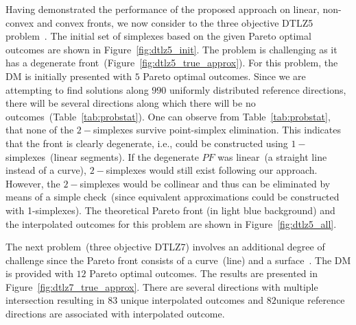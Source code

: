 Having demonstrated the performance of the proposed approach on linear, non-convex and convex fronts, we now consider to the three objective DTLZ5 problem~\cite{deb2002scalable}.  The initial set of {\color{blue}simplexes} based on the given Pareto optimal outcomes are shown in Figure~\ref{fig:dtlz5_init}. The problem is challenging as it has a degenerate front~(Figure~\ref{fig:dtlz5_true_approx}). For this problem, the DM is initially presented with $5$ Pareto optimal outcomes. Since we are attempting to find solutions along $990$ uniformly distributed reference directions, there will be several directions along which there will be no outcomes~(Table~\ref{tab:probstat}). One can observe from Table~\ref{tab:probstat}, that none of the $2-${\color{blue}simplexes} survive point-{\color{blue}simplex} elimination. This indicates that the front is clearly degenerate, i.e., could be constructed using $1-${\color{blue}simplexes}~(linear segments). If the degenerate $PF$ was linear~(a straight line instead of a curve), $2-${\color{blue}simplexes} would still exist following our approach. However, the $2-${\color{blue}simplexes} would be collinear and thus can be eliminated {\color{blue}by means of a simple check}~(since equivalent approximations could be constructed with 1-{\color{blue}simplexes}). The theoretical Pareto front (in light blue background) and the interpolated outcomes for this problem are shown in Figure~\ref{fig:dtlz5_all}.

\begin{figure*}[!ht]
	\centering
	\caption{DTLZ5: (a) Set of initial {\color{blue}simplexes} (b) Survived {\color{blue}simplexes} (c) Interpolated outcomes}
	\label{fig:dtlz5_true_approx}
\end{figure*}

The next problem~(three objective DTLZ7) involves an additional degree of challenge since the Pareto front consists of a curve~(line) and a surface~\cite{deb2002scalable}. The DM is provided with $12$ Pareto optimal outcomes. The results are presented in Figure~\ref{fig:dtlz7_true_approx}. There are several directions with multiple intersection resulting in $83$ unique interpolated outcomes and $82$unique reference directions are associated with interpolated outcome. 

